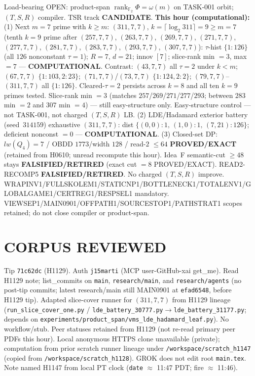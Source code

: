 \documentclass[11pt]{article}
\begin{document}
Load-bearing OPEN: product-span $\operatorname{rank}_{\mathbb F_2}\Phi=\omega(m)$ on TASK-001 orbit;
$(T,S,R)$ compiler. TSR track \textbf{CANDIDATE}.
\textbf{This hour (computational):}
(1) Next $m{=}7$ prime with $k{\ge}m$: $(311,7,7)$, $k=\lceil\log_2 311\rceil=9{\ge}m{=}7$
(tenth $k{=}9$ prime after $(257,7,7)$, $(263,7,7)$, $(269,7,7)$, $(271,7,7)$, $(277,7,7)$, $(281,7,7)$, $(283,7,7)$, $(293,7,7)$, $(307,7,7)$):
$\tau$-hist $\{1{:}126\}$ (all $126$ nonconstant $\tau{=}1$); $R{=}7$, $d{=}21$; innov $[7]$;
slice-rank min $=3$, max $=7$ --- \textbf{COMPUTATIONAL}.
Contrast: $(43,7,7)$ all $\tau{=}2$ under $k{<}m$; $(67,7,7)$ $\{1{:}103,2{:}23\}$;
$(71,7,7)$/$(73,7,7)$ $\{1{:}124,2{:}2\}$; $(79,7,7)$--$(311,7,7)$ all $\{1{:}126\}$.
Cleared-$\tau{=}2$ persists across $k{=}8$ and all ten $k{=}9$ primes tested.
Slice-rank min $=3$ (matches $257$/$269$/$271$/$277$/$293$; between $283$ min $=2$ and $307$ min $=4$) --- still easy-structure only.
Easy-structure control --- not TASK-001, not charged $(T,S,R)$ LB.
(2) LDE/Hadamard exterior battery (seed~$314159$) exhaustive $(311,7,7)$:
dist $\{(0,0){:}1,\,(1,0){:}1,\,(7,21){:}126\}$; deficient nonconst $=0$ --- \textbf{COMPUTATIONAL}.
(3) Closed-set DP: $lw(Q_4)=7$ / OBDD $1773$/width $128$ / read-$2$ $\le64$
\textbf{PROVED/EXACT} (retained from H0610; unread recompute this hour).
Idea~F semantic-cut $\ge48$ stays \textbf{FALSIFIED/RETIRED} (exact cut $=8$ PROVED/EXACT).
READ2-RECOMP5 \textbf{FALSIFIED/RETIRED}. No charged $(T,S,R)$ improve.
WRAPINV1/FULLSKOLEM1/STATICNP1/BOTTLENECK1/TOTALENV1/GLOBALGAME1/CERTREG1/RESPSEL1 mandatory.
VIEWSEP1/MAIN0901/OFFPATH1/SOURCESTOP1/PATHSTRAT1 scopes retained; do not close compiler or product-span.

\section*{CORPUS REVIEWED}
Tip \texttt{71c62dc} (H1129). Auth \texttt{j15marti} (MCP user-GitHub-xai get\_me).
Read H1129 note; list\_commits on \texttt{main}, \texttt{research/main}, and \texttt{research/agents}
(no post-tip commits; latest research/main still MAIN0901 at \texttt{efad6548}, before H1129 tip).
Adapted slice-cover runner for $(311,7,7)$ from H1129 lineage
(\texttt{run\_slice\_cover\_one.py} / \texttt{lde\_battery\_30777.py}$\to$\texttt{lde\_battery\_31177.py};
depends on \texttt{experiments/product\_span/vms\_lde\_hadamard\_leaf.py}).
No workflow/stub. Peer statuses retained from H1129 (not re-read primary peer PDFs this hour).
Local anonymous HTTPS clone unavailable (private);
computation from prior scratch runner lineage under \texttt{/workspace/scratch\_h1147}
(copied from \texttt{/workspace/scratch\_h1128}).
GROK does not edit root \texttt{main.tex}.
Note named H1147 from local PT clock (\texttt{date} $\approx$ 11:47 PDT; fire $\approx$ 11:46).
\end{document}
